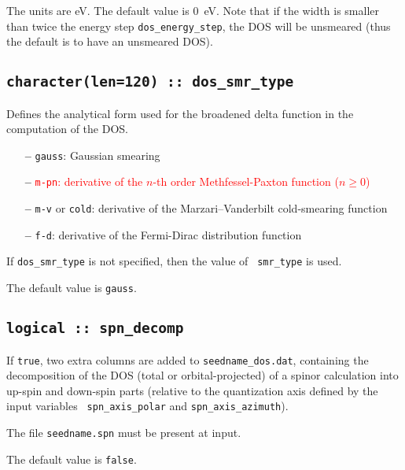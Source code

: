 The units are eV. The default value is 0~eV. Note that if the width is
smaller than twice the energy step {\tt dos\_energy\_step}, the DOS
will be unsmeared (thus the default is to have an unsmeared DOS).


\subsection[dos\_smr\_type]{\tt  character(len=120) :: dos\_smr\_type}

Defines the analytical form used for the broadened delta function in
the computation of the DOS.

\begin{itemize}
  
\item[{\bf --}]
  {\tt gauss}: Gaussian smearing

\item[{\bf --}]
  \textcolor{red}{{\tt m-pn}: derivative of the $n$-th order
    Methfessel-Paxton function ($n\geq 0$)}

\item[{\bf --}]
  {\tt m-v} or {\tt cold}: derivative of the Marzari--Vanderbilt cold-smearing function

\item[{\bf --}]
  {\tt f-d}: derivative of the Fermi-Dirac distribution function

\end{itemize}

If {\tt dos\_smr\_type} is not specified, then the value of {\tt
  smr\_type} is used.  

The default value is {\tt gauss}.

\subsection[spn\_decomp]{\tt logical :: spn\_decomp}
If {\tt true}, two extra columns are added to {\tt seedname\_dos.dat},
containing the decomposition of the DOS (total or orbital-projected)
of a spinor calculation into up-spin and down-spin parts (relative to
the quantization axis defined by the input variables {\tt
  spn\_axis\_polar} and {\tt spn\_axis\_azimuth}). 

The file {\tt seedname.spn} must be present at input.

The default value is \verb#false#.


